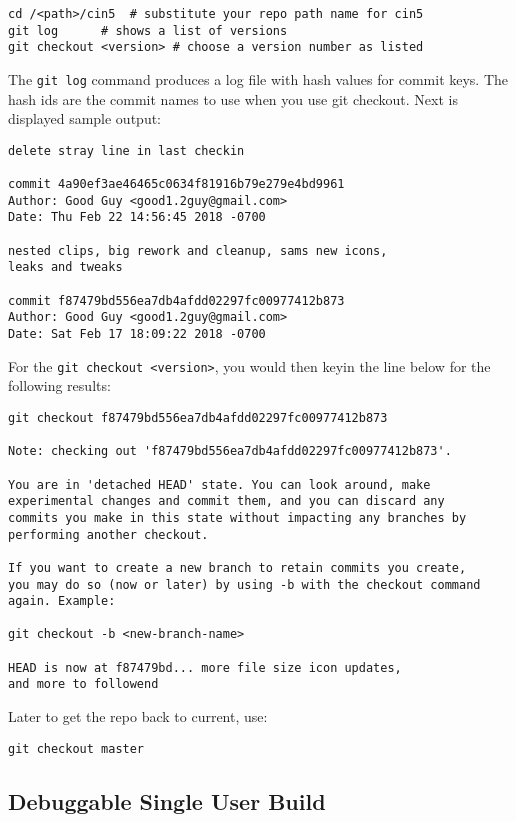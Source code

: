 \begin{lstlisting}[style=sh]
cd /<path>/cin5  # substitute your repo path name for cin5
git log		 # shows a list of versions
git checkout <version> # choose a version number as listed
\end{lstlisting}

The \texttt{git log} command produces a log file with hash values
for commit keys. The hash ids are the commit names to use when you
use git checkout. Next is displayed sample output:

\begin{lstlisting}[style=nil]
delete stray line in last checkin

commit 4a90ef3ae46465c0634f81916b79e279e4bd9961
Author: Good Guy <good1.2guy@gmail.com>
Date: Thu Feb 22 14:56:45 2018 -0700

nested clips, big rework and cleanup, sams new icons,
leaks and tweaks

commit f87479bd556ea7db4afdd02297fc00977412b873
Author: Good Guy <good1.2guy@gmail.com>
Date: Sat Feb 17 18:09:22 2018 -0700
\end{lstlisting}

For the \texttt{git checkout <version>}, you would then keyin the
line below for the following results:

\begin{lstlisting}[style=nil]
git checkout f87479bd556ea7db4afdd02297fc00977412b873

Note: checking out 'f87479bd556ea7db4afdd02297fc00977412b873'.

You are in 'detached HEAD' state. You can look around, make
experimental changes and commit them, and you can discard any
commits you make in this state without impacting any branches by
performing another checkout.

If you want to create a new branch to retain commits you create,
you may do so (now or later) by using -b with the checkout command
again. Example:

git checkout -b <new-branch-name>

HEAD is now at f87479bd... more file size icon updates,
and more to followend
\end{lstlisting}

Later to get the repo back to current, use:
\begin{lstlisting}[style=sh]
git checkout master
\end{lstlisting}


\subsection{Debuggable Single User Build}%
\label{sub:debuggable_single_user_build}

